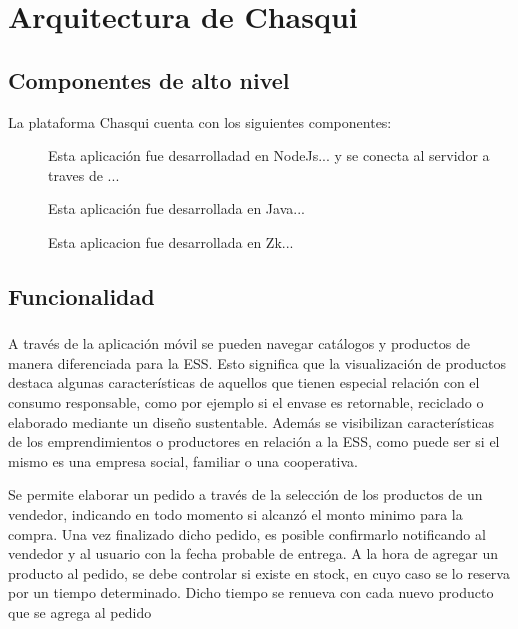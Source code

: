 \chapter{Arquitectura de Chasqui}

\section{Componentes de alto nivel}
La plataforma Chasqui cuenta con los siguientes componentes:

\begin{description}
\item[\App] Esta aplicación fue desarrolladad en NodeJs... y se conecta al servidor a traves de ...


\item[\Be] Esta aplicación fue desarrollada en Java...

\item[\Bo] Esta aplicacion fue desarrollada en Zk...

\end{description}


\section{Funcionalidad}

\subsection{\App}

A través de la aplicación móvil se pueden navegar catálogos y productos de manera diferenciada para la ESS. Esto significa que la visualización de productos destaca algunas características de aquellos que tienen especial relación con el consumo responsable, como por ejemplo si el envase es retornable, reciclado o elaborado mediante un diseño sustentable. Además se visibilizan características de los emprendimientos o productores en relación a la ESS, como puede ser si el mismo es una empresa social, familiar o una cooperativa. 

Se permite elaborar un pedido a través de la selección de los productos de un vendedor, indicando en todo momento si alcanzó el monto minimo para la compra. Una vez finalizado dicho pedido, es posible confirmarlo notificando al vendedor y al usuario con la fecha probable de entrega. A la hora de agregar un producto al pedido, se debe controlar si existe en stock, en cuyo caso se lo reserva por un tiempo determinado. Dicho tiempo se renueva con cada nuevo producto que se agrega al pedido

